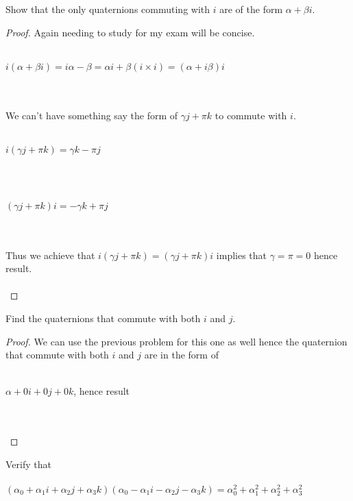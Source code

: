 \documentclass[12pt]{article}
\newenvironment{problem}[2][Problem]{\begin{trivlist}
\item[\hskip \labelsep {\bfseries #1}\hskip \labelsep {\bfseries #2.}]}{\end{trivlist}}
\begin{document}
\begin{problem}{4.1.14}
Show that the only quaternions commuting with $i$ are of the form $\alpha + \beta i$.
\end{problem}

\begin{proof}
Again needing to study for my exam will be concise. \\ \\
\centerline{$i(\alpha + \beta i) = i\alpha -\beta = \alpha i + \beta(i \times i) = (\alpha +i \beta)i$} \\ \\
We can't have something say the form of $\gamma j + \pi k$ to commute with $i$. \\ \\
\centerline{$i(\gamma j + \pi k) = \gamma k - \pi j$} \\ \\
\centerline{$(\gamma j + \pi k)i=- \gamma k + \pi j$} \\ \\
Thus we achieve that $i(\gamma j + \pi k) = (\gamma j + \pi k)i$ implies that $\gamma = \pi = 0$ hence result. \\ \\
\end{proof}

\begin{problem}{4.1.15}
Find the quaternions that commute with both $i$ and $j$.
\end{problem}

\begin{proof}
We can use the previous problem for this one as well hence the quaternion that commute with both $i$ and $j$ are in the form of \\ \\
\centerline{$\alpha +0i +0j+0k$, hence result} \\ \\
\end{proof}
 
\begin{problem}{4.1.16}
Verify that \\ \\
$(\alpha_0 + \alpha_1i +\alpha_2j +\alpha_3k)(\alpha_0 - \alpha_1i -\alpha_2j -\alpha_3k) = \alpha^2_0+\alpha^2_1+\alpha^2_2+\alpha^2_3$
\end{problem}
\end{document}
